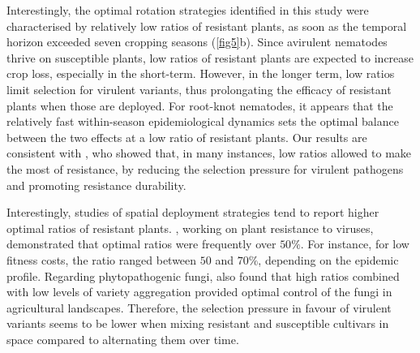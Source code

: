 {{{{Interestingly, the optimal rotation strategies identified in this study
were characterised by relatively low ratios of resistant plants, as
soon as the temporal horizon exceeded seven cropping seasons (\autoref{fig5}b).
Since avirulent nematodes thrive on susceptible plants, low ratios
of resistant plants are expected to increase crop loss, especially
in the short-term. However, in the longer term, low ratios limit selection
for virulent variants, thus prolongating the efficacy of resistant
plants when those are deployed. For {root-knot nematodes}, it appears that the relatively
fast within-season epidemiological dynamics sets the optimal balance
between the two effects at a low ratio of resistant plants. Our results
are consistent with \citet{vandenBosch2003}, who showed that, in
many instances, low ratios allowed to make the most of resistance,
by reducing the selection pressure for virulent pathogens and promoting
resistance durability.

Interestingly, studies of spatial deployment strategies tend to report
higher optimal ratios of resistant plants. \citet{Fabre2012}, working
on plant resistance to viruses, demonstrated that optimal ratios were
frequently over $50\%$. For instance, for low fitness costs, the
ratio ranged between $50$ and $70\%$, depending on the epidemic
profile. Regarding phytopathogenic fungi, \citet{Papaix2014} also
found that high ratios combined with low levels of variety aggregation
provided optimal control of the fungi in agricultural landscapes.
Therefore, the selection pressure in favour of virulent variants seems
to be lower when mixing resistant and susceptible cultivars in space
compared to alternating them over time.

}}}}

